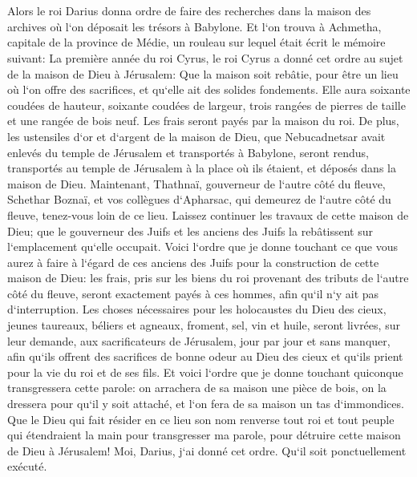 \chapter{}

\verse Alors le roi Darius donna ordre de faire des recherches dans la maison des archives où l`on déposait les trésors à Babylone. 
\verse Et l`on trouva à Achmetha, capitale de la province de Médie, un rouleau sur lequel était écrit le mémoire suivant: 
\verse La première année du roi Cyrus, le roi Cyrus a donné cet ordre au sujet de la maison de Dieu à Jérusalem: Que la maison soit rebâtie, pour être un lieu où l`on offre des sacrifices, et qu`elle ait des solides fondements. Elle aura soixante coudées de hauteur, soixante coudées de largeur, 
\verse trois rangées de pierres de taille et une rangée de bois neuf. Les frais seront payés par la maison du roi. 
\verse De plus, les ustensiles d`or et d`argent de la maison de Dieu, que Nebucadnetsar avait enlevés du temple de Jérusalem et transportés à Babylone, seront rendus, transportés au temple de Jérusalem à la place où ils étaient, et déposés dans la maison de Dieu. 
\verse Maintenant, Thathnaï, gouverneur de l`autre côté du fleuve, Schethar Boznaï, et vos collègues d`Apharsac, qui demeurez de l`autre côté du fleuve, tenez-vous loin de ce lieu. 
\verse Laissez continuer les travaux de cette maison de Dieu; que le gouverneur des Juifs et les anciens des Juifs la rebâtissent sur l`emplacement qu`elle occupait. 
\verse Voici l`ordre que je donne touchant ce que vous aurez à faire à l`égard de ces anciens des Juifs pour la construction de cette maison de Dieu: les frais, pris sur les biens du roi provenant des tributs de l`autre côté du fleuve, seront exactement payés à ces hommes, afin qu`il n`y ait pas d`interruption. 
\verse Les choses nécessaires pour les holocaustes du Dieu des cieux, jeunes taureaux, béliers et agneaux, froment, sel, vin et huile, seront livrées, sur leur demande, aux sacrificateurs de Jérusalem, jour par jour et sans manquer, 
\verse afin qu`ils offrent des sacrifices de bonne odeur au Dieu des cieux et qu`ils prient pour la vie du roi et de ses fils. 
\verse Et voici l`ordre que je donne touchant quiconque transgressera cette parole: on arrachera de sa maison une pièce de bois, on la dressera pour qu`il y soit attaché, et l`on fera de sa maison un tas d`immondices. 
\verse Que le Dieu qui fait résider en ce lieu son nom renverse tout roi et tout peuple qui étendraient la main pour transgresser ma parole, pour détruire cette maison de Dieu à Jérusalem! Moi, Darius, j`ai donné cet ordre. Qu`il soit ponctuellement exécuté. 
